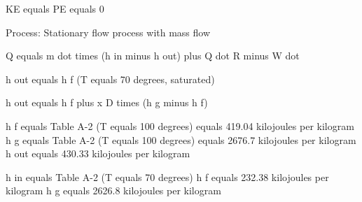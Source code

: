 KE equals PE equals 0  

Process: Stationary flow process with mass flow  

Q equals m dot times (h in minus h out) plus Q dot R minus W dot  

h out equals h f (T equals 70 degrees, saturated)  

h out equals h f plus x D times (h g minus h f)  

h f equals Table A-2 (T equals 100 degrees) equals 419.04 kilojoules per kilogram  
h g equals Table A-2 (T equals 100 degrees) equals 2676.7 kilojoules per kilogram  
h out equals 430.33 kilojoules per kilogram  

h in equals Table A-2 (T equals 70 degrees)  
h f equals 232.38 kilojoules per kilogram  
h g equals 2626.8 kilojoules per kilogram